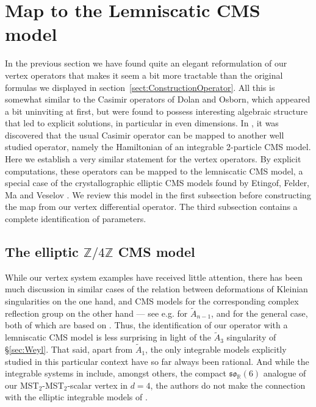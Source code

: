 \documentclass{article}
\def \Zs {\mathbb{Z}}
\def \Rs {\mathbb{R}}
\begin{document}
\section{Map to the Lemniscatic CMS model}
\label{sect:MappingElliptic}

In the previous section we have found quite an elegant reformulation of our vertex operators that 
makes it seem a bit more tractable than the original formulas we displayed in section~\ref{sect:ConstructionOperator}. All this is somewhat similar to the Casimir operators 
of Dolan and Osborn, which appeared a bit uninviting at first, but were found to possess 
interesting algebraic structure that led to explicit solutions, in particular 
in even dimensions. In \cite{Isachenkov:2016gim}, it was discovered that the usual Casimir operator can be mapped to another well studied operator, 
namely the Hamiltonian of an integrable 2-particle CMS model. Here we establish a very similar statement for the vertex operators. By 
explicit computations, these operators can be mapped to the lemniscatic CMS  
model, a special case of the  crystallographic elliptic CMS models found 
by Etingof, Felder, Ma and Veselov \cite{etingof2011107}. We review this model in the first 
subsection before constructing the map from our vertex differential operator. The 
third subsection contains a complete identification of parameters. 

\subsection{The elliptic \texorpdfstring{$\Zs/4 \Zs$}{Z/4Z} CMS model}

While our vertex system examples have received little attention, there has been much 
discussion in similar cases of the relation between deformations of Kleinian singularities 
on the one hand, and CMS models for the corresponding complex 
reflection group on the other hand --- see e.g. \cite{oblomkov2005deformed} for 
$\tilde{A}_{n-1}$, and \cite{etingof2007harish} for the general case, both of which are 
based on \cite{holland1999quantization}. Thus, the identification of our operator with a 
lemniscatic CMS model is less surprising in light of the $\tilde{A}_3$ singularity of 
\S\ref{sec:Weyl}. That said, apart from $\tilde{A}_{1}$, the only integrable models 
explicitly studied in this particular context have so far always been rational. And while 
the integrable systems in \cite{etingof2008lie} include, amongst others, the compact
$\mathfrak{so}_{\Rs}(6)$ analogue of our MST$_2$-MST$_2$-scalar vertex in $d=4$, the authors do 
not make the connection with the elliptic integrable models of \cite{etingof2011107}. 
\end{document}
